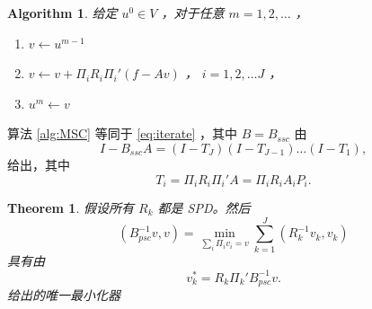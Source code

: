 \documentclass[12pt]{acta_2011xz}
\newtheorem{theorem}{Theorem}[section]
\newtheorem{algorithm}[equation]{Algorithm}
\begin{document}
   \begin{algorithm}   \caption{连续子空间校正法  }       \label{alg:MSC}    给定    $u^0\in V$    ，对于任意    $m=1,2,\ldots$    ，
   \begin{enumerate}[1.]

    \item            $v\leftarrow u^{m-1}$            \item            $v\leftarrow v+\Pi_iR_i\Pi_i'(f-Av)$         ，         $i=1,2,\ldots J$         ，   \item            $u^m\leftarrow v$           \end{enumerate}     \end{algorithm}     

算法    \ref{alg:MSC}    等同于    \eqref{eq:iterate}   ，其中
   $B=B_{ssc}$    由
   \begin{equation}
  \label{ssc}
I-B_{ssc}A= (I-T_J)(I-T_{J-1})\ldots(I-T_1),
\end{equation}    给出，其中
   \begin{equation}
  \label{Ti}
T_i  =\Pi_iR_i\Pi_i'A =\Pi_iR_iA_iP_i.
\end{equation}     

   \begin{theorem}   \label{thm:add}    假设所有    $R_k$    都是 SPD。然后
   \begin{equation}\label{eq:add}
(B_{psc}^{-1} v,v)  = \min_{\sum_i \Pi_iv_i=v}\sum_{k=1}^J(R_k^{-1}v_k, v_k)
\end{equation}    具有由
   \begin{equation}
  v_k^*=R_k\Pi_k'B_{psc}^{-1}v.
\end{equation}    给出的唯一最小化器  \end{theorem}     
\end{document}
